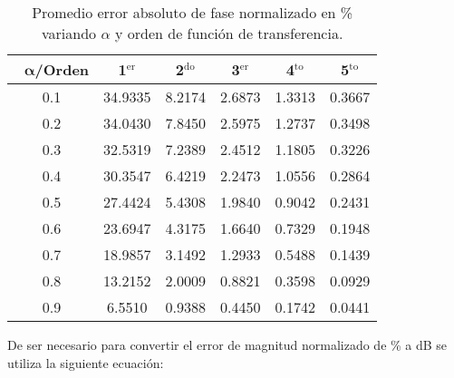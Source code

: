 	\begin{table}[!ht]                                 
	\centering            
	\caption{Promedio error absoluto de fase normalizado en \% variando $\alpha$ y orden de función de transferencia.}                           
	\label{tab:prom_error_fase_norm}                               
		\begin{tabular}{cccccc}
			\hline                                             
			$\,\,\,\,\bm{\alpha}$\textbf{/Orden} & \textbf{1$^{\mathrm{er}}$} & \textbf{2$^{\mathrm{do}}$} & \textbf{3$^{\mathrm{er}}$} & \textbf{4$^{\mathrm{to}}$} & \textbf{5$^{\mathrm{to}}$} \\                     
			\hline                                             
			0.1 & 34.9335 & 8.2174 & 2.6873 & 1.3313 & 0.3667 \\
			                                              
			0.2 & 34.0430 & 7.8450 & 2.5975 & 1.2737 & 0.3498 \\
			                                           
			0.3 & 32.5319 & 7.2389 & 2.4512 & 1.1805 & 0.3226 \\
			                                              
			0.4 & 30.3547 & 6.4219 & 2.2473 & 1.0556 & 0.2864 \\
			                                            
			0.5 & 27.4424 & 5.4308 & 1.9840 & 0.9042 & 0.2431 \\
			                                          
			0.6 & 23.6947 & 4.3175 & 1.6640 & 0.7329 & 0.1948 \\
			                                             
			0.7 & 18.9857 & 3.1492 & 1.2933 & 0.5488 & 0.1439 \\
			                                           
			0.8 & 13.2152 & 2.0009 & 0.8821 & 0.3598 & 0.0929 \\
			                                              
			0.9 & 6.5510 & 0.9388 & 0.4450 & 0.1742 & 0.0441 \\ 
			\hline                                             
		\end{tabular}                                                             
	\end{table}


	De ser necesario para convertir el error de magnitud normalizado de \% a dB se utiliza la siguiente ecuación:
	
